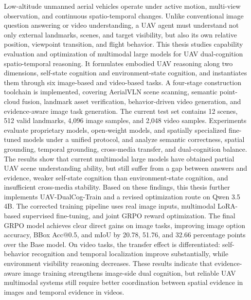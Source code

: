 \begin{engabstract}
    Low-altitude unmanned aerial vehicles operate under active motion, multi-view observation, and continuous spatio-temporal changes. Unlike conventional image question answering or video understanding, a UAV agent must understand not only external landmarks, scenes, and target visibility, but also its own relative position, viewpoint transition, and flight behavior. This thesis studies capability evaluation and optimization of multimodal large models for UAV dual-cognition spatio-temporal reasoning. It formulates embodied UAV reasoning along two dimensions, self-state cognition and environment-state cognition, and instantiates them through six image-based and video-based tasks. A four-stage construction toolchain is implemented, covering AerialVLN scene scanning, semantic point-cloud fusion, landmark asset verification, behavior-driven video generation, and evidence-aware image task generation. The current test set contains 12 scenes, 512 valid landmarks, 4,096 image samples, and 2,048 video samples. Experiments evaluate proprietary models, open-weight models, and spatially specialized fine-tuned models under a unified protocol, and analyze semantic correctness, spatial grounding, temporal grounding, cross-media transfer, and dual-cognition balance. The results show that current multimodal large models have obtained partial UAV scene understanding ability, but still suffer from a gap between answers and evidence, weaker self-state cognition than environment-state cognition, and insufficient cross-media stability. Based on these findings, this thesis further implements UAV-DualCog-Train and a revised optimization route on Qwen 3.5 4B. The corrected training pipeline uses real image inputs, multimodal LoRA-based supervised fine-tuning, and joint GRPO reward optimization. The final GRPO model achieves clear direct gains on image tasks, improving image option accuracy, BBox Acc@0.5, and mIoU by 20.78, 51.76, and 32.66 percentage points over the Base model. On video tasks, the transfer effect is differentiated: self-behavior recognition and temporal localization improve substantially, while environment visibility reasoning decreases. These results indicate that evidence-aware image training strengthens image-side dual cognition, but reliable UAV multimodal systems still require better coordination between spatial evidence in images and temporal evidence in videos.
\end{engabstract}
